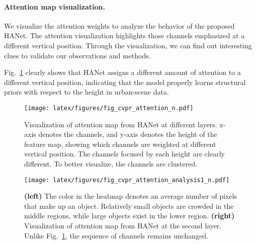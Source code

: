 \documentclass[10pt,twocolumn,letterpaper]{article}
\begin{document}
\paragraph{Attention map visualization.}
We visualize the attention weights to analyze the behavior of the proposed HANet.  The attention visualization highlights those channels emphasized at a different vertical position.
Through the visualization, we can find out interesting clues to validate our observations and methods.

Fig.~\ref{fig:vis_attention} clearly shows that HANet assigns a different amount of attention to a different vertical position, indicating that the model properly learns structural priors with respect to the height in urban-scene data.

\begin{figure}[h]
\begin{center}
\texttt{[image: latex/figures/fig\_cvpr\_attention\_n.pdf]}
\end{center}
\vspace*{-0.5cm}
   \caption{Visualization of attention map from HANet at different layers. x-axis denotes the channels, and y-axis denotes the height of the feature map, showing which channels are weighted at different vertical position. The channels focused by each height are clearly different. To better visualize, the channels are clustered.}
\label{fig:vis_attention}
\vspace*{-0.2cm}
\end{figure}






\begin{figure}[!b]
\vspace*{-0.4cm}
\begin{center}
\texttt{[image: latex/figures/fig\_cvpr\_attention\_analysis1\_n.pdf]}
\end{center}
\vspace*{-0.6cm}
   \caption{\textbf{(left)} The color in the heatmap denotes an average number of pixels that make up an object.
Relatively small objects are crowded in the middle regions, while large objects exist in the lower region. 
\textbf{(right)} Visualization of attention map from HANet at the second layer. Unlike Fig.~\ref{fig:vis_attention}, the sequence of channels remains unchanged.}
\label{fig:vis_aspp}
\end{figure}
\end{document}

